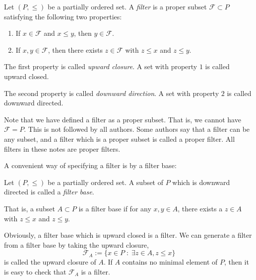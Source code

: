 \documentclass{owmaths}
\begin{document}
\begin{definition}
    Let $(P,\leq)$ be a partially ordered set. A \emph{filter} is a 
    proper subset $\mathcal{F} \subset P$
    satisfying the following two properties:
    \begin{enumerate}
        \item{} If $x \in \mathcal{F}$ and $x \leq y$, then $y \in \mathcal{F}$.
        \item{} If $x,y \in \mathcal{F}$, then there exists $z \in \mathcal{F}$
        with $z \leq x$ and $z \leq y$.
    \end{enumerate}
    The first property is called \emph{upward closure}. A set with property
    $1$ is called upward closed. 
    
    The second property is called \emph{downward direction}. A set
    with property $2$ is called downward directed.
\end{definition}
Note that we have defined a filter as a proper subset. That is, we
cannot have $\mathcal{F} = P$. This is not followed by all authors. Some
authors say that a filter can be any subset, and a filter which is a proper
subset is called a proper filter. All filters in these 
notes are proper filters.

A convenient way of specifying a filter is by a filter base:
\begin{definition}
    Let $(P,\leq)$ be a partially ordered set. A subset of $P$
    which is downward directed is called a \emph{filter base}.
    
    That is, a subset $A \subset P$ is a filter base if for any $x,y \in A$, 
    there exists a $z \in A$ with $z \leq x$ and $z \leq y$.
    
    Obviously, a filter base which is upward closed is a filter. We can generate
    a filter from a filter base by taking the upward closure,
    \begin{equation*}
        \mathcal{F}_A := \{ x \in P\;:\;\exists z \in A, z \leq x\}
    \end{equation*}
    is called the upward closure of $A$. If $A$ contains
    no minimal element of $P$, then it is easy to check that $\mathcal{F}_A$
    is a filter.
\end{definition}
\end{document}
